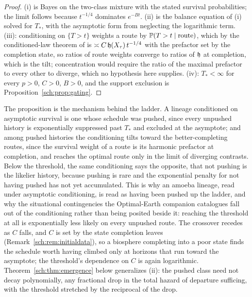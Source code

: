 \begin{remark}
\begin{proof}
(i) is Bayes on the two-class mixture with the stated survival
probabilities; the limit follows because $t^{-1/4}$ dominates
$e^{-Bt}$. (ii) is the balance equation of (i) solved for
$T_\ast$, with the asymptotic form from neglecting the logarithmic
term. (iii): conditioning on $\{T>t\}$ weights a route by
$\mathbb{P}(T>t\mid\text{route})$, which by the conditioned-law theorem of \cite{GoldenSurvivorship} is
$\asymp C\,\mathfrak{h}(X_\tau)\,t^{-1/4}$ with the prefactor set by the completion
state, so ratios of route weights converge to ratios of $\mathfrak{h}$ at
completion, which is the tilt; concentration would require the ratio of
the maximal prefactor to every other to diverge, which no hypothesis
here supplies. (iv): $T_\ast<\infty$ for every $p>0$, $C>0$,
$B>0$, and the support exclusion is
Proposition~\ref{sch:prop:gating}.
\end{proof}

The proposition is the mechanism behind the ladder. A lineage
conditioned on asymptotic survival is one whose schedule was pushed,
since every unpushed history is exponentially suppressed past $T_\ast$
and excluded at the asymptote; and among pushed histories the
conditioning tilts toward the better-completing routes, since the
survival weight of a route is its harmonic prefactor at completion,
and reaches the optimal route only in the limit of diverging
contrasts. Below the
threshold, the same conditioning says the opposite, that not pushing is
the likelier history, because pushing is rare and the exponential
penalty for not having pushed has not yet accumulated. This is why an
amoeba lineage, read under asymptotic conditioning, is read as having
been pushed up the ladder, and why the situational contingencies the
Optimal-Earth companion catalogues fall out of the conditioning rather
than being posited beside it: reaching the threshold at all is
exponentially less likely on every unpushed route. The crossover
recedes as $C$ falls, and $C$ is set by the state completion leaves
(Remark~\ref{sch:rem:initialdata}), so a biosphere completing into a
poor state finds the schedule worth having climbed only at horizons
that run toward the asymptote; the threshold's dependence on $C$ is
again logarithmic. Theorem~\ref{sch:thm:emergence} below generalizes
(ii): the pushed class need not decay polynomially, any fractional drop
in the total hazard of departure sufficing, with the threshold stretched
by the reciprocal of the drop.


\end{remark}
